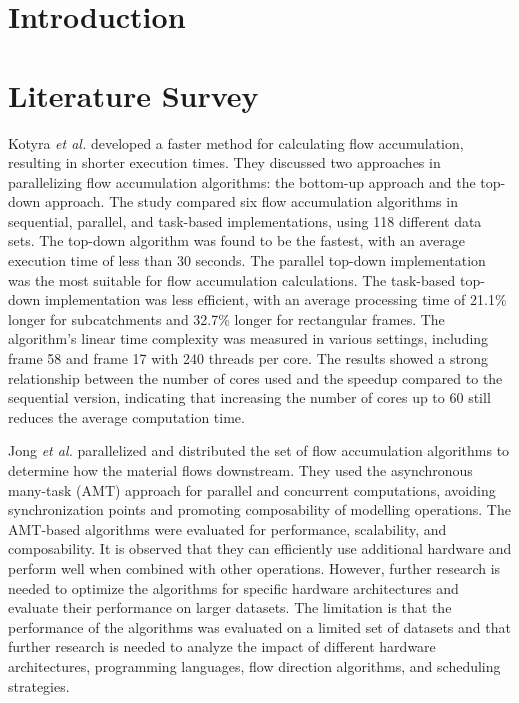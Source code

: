 \documentclass[journal, a4paper]{IEEEtran}
\begin{document}
	
	
	
	\maketitle
	
	\thispagestyle{empty}
	\section{Introduction}
	

	\section{Literature Survey} 
	\label{sec: ls}
	
	Kotyra \textit{et al.} \cite{KOTYRA2021104741} developed a faster method for calculating flow accumulation, resulting in shorter execution times. They discussed two approaches in parallelizing flow accumulation algorithms: the bottom-up approach and the top-down approach. The study compared six flow accumulation algorithms in sequential, parallel, and task-based implementations, using 118 different data sets. The top-down algorithm was found to be the fastest, with an average execution time of less than 30 seconds. The parallel top-down implementation was the most suitable for flow accumulation calculations. The task-based top-down implementation was less efficient, with an average processing time of 21.1\% longer for subcatchments and 32.7\% longer for rectangular frames. The algorithm's linear time complexity was measured in various settings, including frame 58 and frame 17 with 240 threads per core. The results showed a strong relationship between the number of cores used and the speedup compared to the sequential version, indicating that increasing the number of cores up to 60 still reduces the average computation time.

	Jong \textit{et al.} \cite{DEJONG2022105083} parallelized and distributed the set of flow accumulation algorithms to determine how the material flows downstream. They used the asynchronous many-task (AMT) approach for parallel and concurrent computations, avoiding synchronization points and promoting composability of modelling operations. The AMT-based algorithms were evaluated for performance, scalability, and composability. It is observed that they can efficiently use additional hardware and perform well when combined with other operations. However, further research is needed to optimize the algorithms for specific hardware architectures and evaluate their performance on larger datasets. The limitation is that the performance of the algorithms was evaluated on a limited set of datasets and that further research is needed to analyze the impact of different hardware architectures, programming languages, flow direction algorithms, and scheduling strategies.
	
\end{document}
